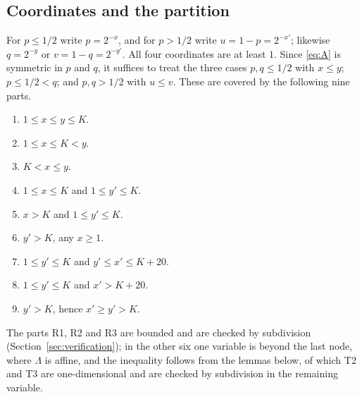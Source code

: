 \documentclass[11pt]{amsart}
\theoremstyle{remark}
\begin{document}
\subsection*{Coordinates and the partition}
For $p\le1/2$ write $p=2^{-x}$, and for $p>1/2$ write $u=1-p=2^{-x'}$; likewise $q=2^{-y}$ or $v=1-q=2^{-y'}$. All four coordinates are at least $1$. Since \eqref{eq:A} is symmetric in $p$ and $q$, it suffices to treat the three cases $p,q\le1/2$ with $x\le y$; $p\le1/2<q$; and $p,q>1/2$ with $u\le v$. These are covered by the following nine parts.
\begin{enumerate}
\item[R1.] $1\le x\le y\le K$.
\item[T2.] $1\le x\le K<y$.
\item[T1.] $K<x\le y$.
\item[R2.] $1\le x\le K$ and $1\le y'\le K$.
\item[T3.] $x>K$ and $1\le y'\le K$.
\item[R2d.] $y'>K$, any $x\ge1$.
\item[R3.] $1\le y'\le K$ and $y'\le x'\le K+20$.
\item[R3d.] $1\le y'\le K$ and $x'>K+20$.
\item[R3b.] $y'>K$, hence $x'\ge y'>K$.
\end{enumerate}
The parts R1, R2 and R3 are bounded and are checked by subdivision (Section~\ref{sec:verification}); in the other six one variable is beyond the last node, where $\Lambda$ is affine, and the inequality follows from the lemmas below, of which T2 and T3 are one-dimensional and are checked by subdivision in the remaining variable.
\end{document}
